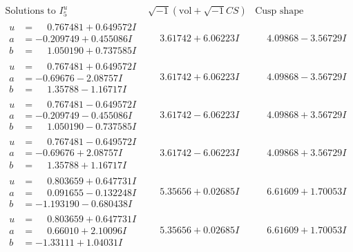 \documentclass[1p]{elsarticle_modified}
\theoremstyle{definition}
\newcommand{\I}{\sqrt{-1}}
\begin{document}
$$\begin{array}{c|c|c}  
\text{Solutions to }I^u_{5}& \I (\text{vol} + \sqrt{-1}CS) & \text{Cusp shape}\\
 \hline 
\begin{aligned}
u &= \phantom{-}0.767481 + 0.649572 I \\
a &= -0.209749 + 0.455086 I \\
b &= \phantom{-}1.050190 + 0.737585 I\end{aligned}
 & \phantom{-}3.61742 + 6.06223 I & \phantom{-}4.09868 - 3.56729 I \\ \hline\begin{aligned}
u &= \phantom{-}0.767481 + 0.649572 I \\
a &= -0.69676 - 2.08757 I \\
b &= \phantom{-}1.35788 - 1.16717 I\end{aligned}
 & \phantom{-}3.61742 + 6.06223 I & \phantom{-}4.09868 - 3.56729 I \\ \hline\begin{aligned}
u &= \phantom{-}0.767481 - 0.649572 I \\
a &= -0.209749 - 0.455086 I \\
b &= \phantom{-}1.050190 - 0.737585 I\end{aligned}
 & \phantom{-}3.61742 - 6.06223 I & \phantom{-}4.09868 + 3.56729 I \\ \hline\begin{aligned}
u &= \phantom{-}0.767481 - 0.649572 I \\
a &= -0.69676 + 2.08757 I \\
b &= \phantom{-}1.35788 + 1.16717 I\end{aligned}
 & \phantom{-}3.61742 - 6.06223 I & \phantom{-}4.09868 + 3.56729 I \\ \hline\begin{aligned}
u &= \phantom{-}0.803659 + 0.647731 I \\
a &= \phantom{-}0.091655 - 0.132248 I \\
b &= -1.193190 - 0.680438 I\end{aligned}
 & \phantom{-}5.35656 + 0.02685 I & \phantom{-}6.61609 + 1.70053 I \\ \hline\begin{aligned}
u &= \phantom{-}0.803659 + 0.647731 I \\
a &= \phantom{-}0.66010 + 2.10096 I \\
b &= -1.33111 + 1.04031 I\end{aligned}
 & \phantom{-}5.35656 + 0.02685 I & \phantom{-}6.61609 + 1.70053 I \\ \hline\begin{aligned}

\end{aligned}
\end{array}$$
\end{document}
